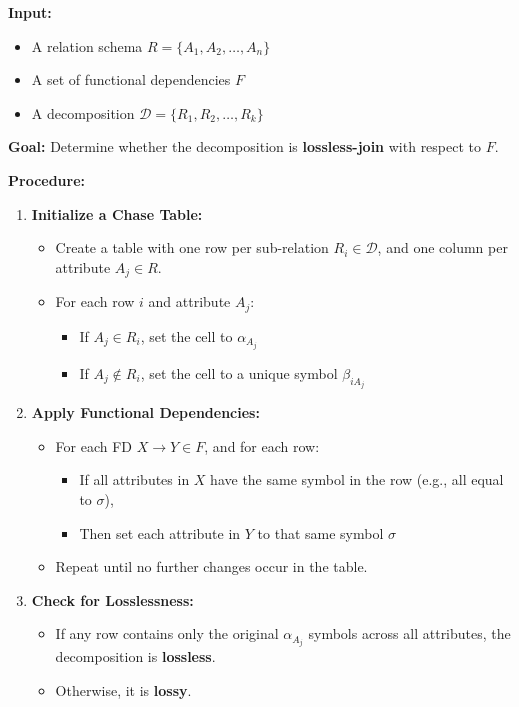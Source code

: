 \documentclass{article}
\begin{document}
\textbf{Input:}
\begin{itemize}
    \item A relation schema \( R = \{A_1, A_2, \dots, A_n\} \)
    \item A set of functional dependencies \( F \)
    \item A decomposition \( \mathcal{D} = \{R_1, R_2, \dots, R_k\} \)
\end{itemize}

\textbf{Goal:} Determine whether the decomposition is \textbf{lossless-join} with respect to \( F \).

\bigskip

\textbf{Procedure:}
\begin{enumerate}[label=\textbf{Step \arabic*.}, leftmargin=2.5em]
    \item \textbf{Initialize a Chase Table:}
    \begin{itemize}
        \item Create a table with one row per sub-relation \( R_i \in \mathcal{D} \), and one column per attribute \( A_j \in R \).
        \item For each row \( i \) and attribute \( A_j \):
        \begin{itemize}
            \item If \( A_j \in R_i \), set the cell to \( \alpha_{A_j} \)
            \item If \( A_j \notin R_i \), set the cell to a unique symbol \( \beta_{iA_j} \)
        \end{itemize}
    \end{itemize}
    
    \item \textbf{Apply Functional Dependencies:}
    \begin{itemize}
        \item For each FD \( X \to Y \in F \), and for each row:
        \begin{itemize}
            \item If all attributes in \( X \) have the same symbol in the row (e.g., all equal to \( \sigma \)),
            \item Then set each attribute in \( Y \) to that same symbol \( \sigma \)
        \end{itemize}
        \item Repeat until no further changes occur in the table.
    \end{itemize}
    
    \item \textbf{Check for Losslessness:}
    \begin{itemize}
        \item If any row contains only the original \( \alpha_{A_j} \) symbols across all attributes, the decomposition is \textbf{lossless}.
        \item Otherwise, it is \textbf{lossy}.
    \end{itemize}
\end{enumerate}
\end{document}

